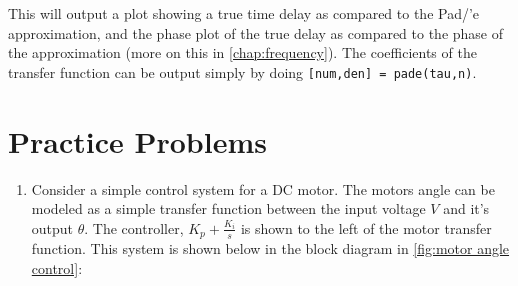This will output a plot showing a true time delay as compared to the Pad/'e approximation, and the phase plot of the true delay as compared to the phase of the approximation (more on this in \autoref{chap:frequency}). The coefficients of the transfer function can be output simply by doing \texttt{[num,den] = pade(tau,n)}.


\section{Practice Problems}

\begin{exercise}[DC Motor]
\begin{enumerate}
    \item Consider a simple control system for a DC motor. The motors angle can be modeled as a simple transfer function between the input voltage $V$ and it's output $\theta$. The controller, $K_p+\frac{K_i}{s}$ is shown to the left of the motor transfer function. This system is shown below in the block diagram in \autoref{fig:motor angle control}:
    \begin{figure}[H]
        \centering
        


\begin{tikzpicture}[x=0.75pt,y=0.75pt,yscale=-0.9,xscale=0.9]


\end{tikzpicture}
\end{figure}
\end{enumerate}
\end{exercise}
